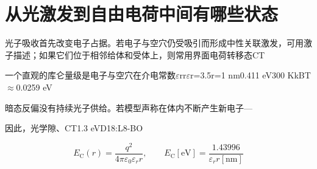 \section{{\cjkfont 从光激发到自由电荷中间有哪些状态}\allowbreak{}}\label{sec:6}
{\cjkfont 光子吸收首先改变电子占据。若电子与空穴仍受吸引而形成中性关联激发，可用激子描述；如果它们位于相邻给体和受体上，则常用界面电荷转移态}\allowbreak{}CT\allowbreak{}
\par
{\cjkfont 一个直观的库仑量级是电子与空穴在介电常数}\allowbreak{}\ensuremath{\varepsilon}r\allowbreak{}r\allowbreak{}\ensuremath{\varepsilon}r=\allowbreak{}3.5\allowbreak{}r=\allowbreak{}1 nm\allowbreak{}0.411 eV\allowbreak{}300 K\allowbreak{}kBT\ensuremath{\approx}\allowbreak{}0.0259 eV\allowbreak{}
\par
{\cjkfont 暗态反偏没有持续光子供给。若模型声称在体内不断产生新电子}\allowbreak{}—\allowbreak{}
\par
{\cjkfont 因此，光学隙、}\allowbreak{}CT\allowbreak{}1.3 eV\allowbreak{}D18:L8-BO\allowbreak{}
\par
\begin{equation}
E_{\mathrm{C}}(r)=\frac{q^2}{4\pi\varepsilon_0\varepsilon_r r},\qquad E_{\mathrm{C}}[\mathrm{eV}]=\frac{1.43996}{\varepsilon_r r[\mathrm{nm}]}
\label{eq:1}\end{equation}
